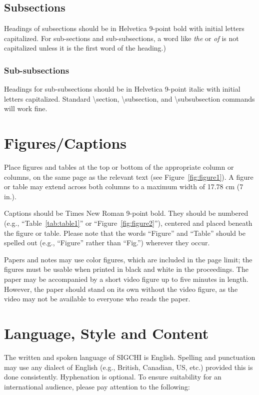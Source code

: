 \documentclass{sigchi}
\begin{document}
\subsection{Subsections}

Headings of subsections should be in Helvetica 9-point bold with
initial letters capitalized.  For
sub-sections and sub-subsections, a word like \emph{the} or \emph{of}
is not capitalized unless it is the first word of the heading.)

\subsubsection{Sub-subsections}

Headings for sub-subsections should be in Helvetica 9-point italic
with initial letters capitalized.  Standard {\textbackslash}section,
{\textbackslash}subsection, and {\textbackslash}subsubsection commands
will work fine.

\section{Figures/Captions}

Place figures and tables at the top or bottom of the appropriate
column or columns, on the same page as the relevant text
(see Figure~\ref{fig:figure1}). A figure or table may extend across both
columns to a maximum width of 17.78 cm (7 in.).

Captions should be Times New Roman 9-point bold.  They should be numbered (e.g.,
``Table~\ref{tab:table1}'' or ``Figure~\ref{fig:figure2}''), centered
and placed beneath the figure or table.  Please note that the words
``Figure'' and ``Table'' should be spelled out (e.g., ``Figure''
rather than ``Fig.'') wherever they occur.

Papers and notes may use color figures, which are included in the page
limit; the figures must be usable when printed in black and white in
the proceedings.  The paper may be accompanied by a short video figure
up to five minutes in length.  However, the paper should stand on its
own without the video figure, as the video may not be available to
everyone who reads the paper.

\section{Language, Style and Content}

The written and spoken language of SIGCHI is English. Spelling and
punctuation may use any dialect of English (e.g., British, Canadian,
US, etc.) provided this is done consistently. Hyphenation is
optional. To ensure suitability for an international audience, please
pay attention to the following:
\end{document}
